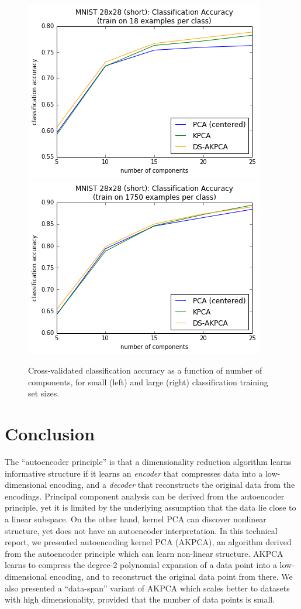 \documentclass[]{article}
\begin{document}
\begin{figure}[h]
\begin{center}
\includegraphics[scale=0.5]{figures/mnist_28_short_classify_18}
\includegraphics[scale=0.5]{figures/mnist_28_short_classify_1750}
\caption{Cross-validated classification accuracy as a function of number of components, for small (left) and large (right) classification training set sizes.}
\end{center}
\label{classification-accuracy}
\end{figure}

\clearpage

\section{Conclusion}

The ``autoencoder principle'' is that a dimensionality reduction algorithm learns informative structure if it learns an \textit{encoder} that compresses data into a low-dimensional encoding, and a \textit{decoder} that reconstructs the original data from the encodings.
Principal component analysis can be derived from the autoencoder principle, yet it is limited by the underlying assumption that the data lie close to a linear subspace.
On the other hand, kernel PCA can discover nonlinear structure, yet does not have an autoencoder interpretation.
In this technical report, we presented autoencoding kernel PCA (AKPCA), an algorithm derived from the autoencoder principle which can learn non-linear structure.
AKPCA learns to compress the degree-2 polynomial expansion of a data point into a low-dimensional encoding, and to reconstruct the original data point from there.
We also presented a ``data-span'' variant of AKPCA which scales better to datasets with high dimensionality, provided that the number of data points is small.
\end{document}
